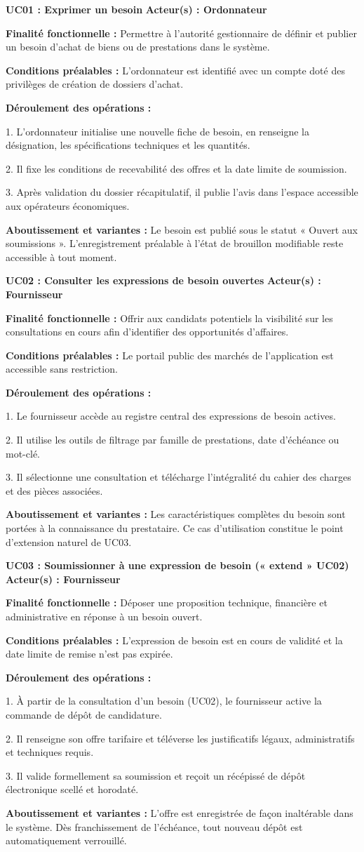 \documentclass[11pt,a4paper]{article}
\newcommand{\ficheusecase}[6]{
  \vspace{0.45em}
  {\noindent\raggedright\textbf{\sffamily\normalsize\color{BleuInstitutionnel}#1} \hfill {\scriptsize\sffamily\bfseries\color{BleuSecondaire} Acteur(s) : #2}\par}
  \vspace{0.1em}
  {\small\textbf{Finalité fonctionnelle :} #3\par}
  {\small\textbf{Conditions préalables :} #4\par}
  {\small\textbf{Déroulement des opérations :}\par
  \vspace{0.05em}
  #5\par}
  \vspace{0.05em}
  {\small\color{BleuSecondaire}\textbf{Aboutissement et variantes :} #6\par}
  \vspace{0.35em}
}
\begin{document}
\ficheusecase{UC01 : Exprimer un besoin}
{Ordonnateur}
{Permettre à l'autorité gestionnaire de définir et publier un besoin d'achat de biens ou de prestations dans le système.}
{L'ordonnateur est identifié avec un compte doté des privilèges de création de dossiers d'achat.}
{1. L'ordonnateur initialise une nouvelle fiche de besoin, en renseigne la désignation, les spécifications techniques et les quantités.\par
2. Il fixe les conditions de recevabilité des offres et la date limite de soumission.\par
3. Après validation du dossier récapitulatif, il publie l'avis dans l'espace accessible aux opérateurs économiques.}
{Le besoin est publié sous le statut « Ouvert aux soumissions ». L'enregistrement préalable à l'état de brouillon modifiable reste accessible à tout moment.}

\ficheusecase{UC02 : Consulter les expressions de besoin ouvertes}
{Fournisseur}
{Offrir aux candidats potentiels la visibilité sur les consultations en cours afin d'identifier des opportunités d'affaires.}
{Le portail public des marchés de l'application est accessible sans restriction.}
{1. Le fournisseur accède au registre central des expressions de besoin actives.\par
2. Il utilise les outils de filtrage par famille de prestations, date d'échéance ou mot-clé.\par
3. Il sélectionne une consultation et télécharge l'intégralité du cahier des charges et des pièces associées.}
{Les caractéristiques complètes du besoin sont portées à la connaissance du prestataire. Ce cas d'utilisation constitue le point d'extension naturel de UC03.}

\ficheusecase{UC03 : Soumissionner à une expression de besoin (« extend » UC02)}
{Fournisseur}
{Déposer une proposition technique, financière et administrative en réponse à un besoin ouvert.}
{L'expression de besoin est en cours de validité et la date limite de remise n'est pas expirée.}
{1. À partir de la consultation d'un besoin (UC02), le fournisseur active la commande de dépôt de candidature.\par
2. Il renseigne son offre tarifaire et téléverse les justificatifs légaux, administratifs et techniques requis.\par
3. Il valide formellement sa soumission et reçoit un récépissé de dépôt électronique scellé et horodaté.}
{L'offre est enregistrée de façon inaltérable dans le système. Dès franchissement de l'échéance, tout nouveau dépôt est automatiquement verrouillé.}
\end{document}
